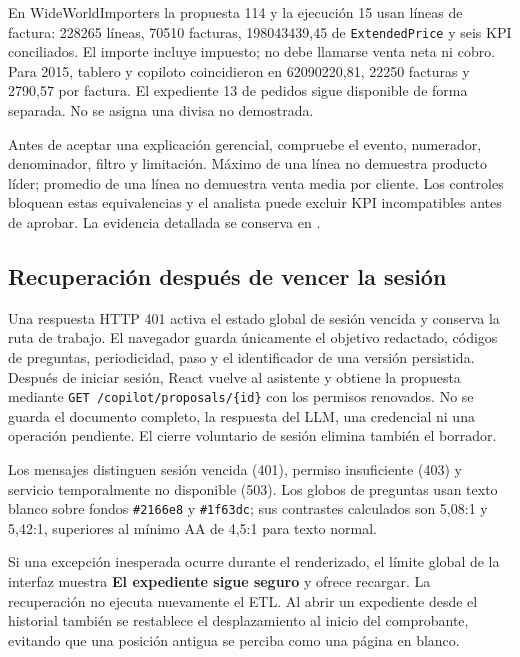 \documentclass[11pt,letterpaper]{article}
\newcommand{\file}[1]{\texttt{#1}}
\begin{document}
En WideWorldImporters la propuesta 114 y la ejecución 15 usan líneas de factura:
228265 líneas, 70510 facturas, 198043439,45 de \file{ExtendedPrice} y seis KPI conciliados.
El importe incluye impuesto; no debe llamarse venta neta ni cobro. Para 2015, tablero y
copiloto coincidieron en 62090220,81, 22250 facturas y 2790,57 por factura. El expediente
13 de pedidos sigue disponible de forma separada. No se asigna una divisa no demostrada.

Antes de aceptar una explicación gerencial, compruebe el evento, numerador, denominador,
filtro y limitación. Máximo de una línea no demuestra producto líder; promedio de una
línea no demuestra venta media por cliente. Los controles bloquean estas equivalencias
y el analista puede excluir KPI incompatibles antes de aprobar. La evidencia detallada
se conserva en .

\subsection{Recuperación después de vencer la sesión}

Una respuesta HTTP 401 activa el estado global de sesión vencida y conserva la ruta de trabajo. El navegador guarda únicamente el objetivo redactado, códigos de preguntas, periodicidad, paso y el identificador de una versión persistida. Después de iniciar sesión, React vuelve al asistente y obtiene la propuesta mediante \file{GET /copilot/proposals/\{id\}} con los permisos renovados. No se guarda el documento completo, la respuesta del LLM, una credencial ni una operación pendiente. El cierre voluntario de sesión elimina también el borrador.

Los mensajes distinguen sesión vencida (401), permiso insuficiente (403) y servicio temporalmente no disponible (503). Los globos de preguntas usan texto blanco sobre fondos \file{\#2166e8} y \file{\#1f63dc}; sus contrastes calculados son 5,08:1 y 5,42:1, superiores al mínimo AA de 4,5:1 para texto normal.

Si una excepción inesperada ocurre durante el renderizado, el límite global de la interfaz muestra \textbf{El expediente sigue seguro} y ofrece recargar. La recuperación no ejecuta nuevamente el ETL. Al abrir un expediente desde el historial también se restablece el desplazamiento al inicio del comprobante, evitando que una posición antigua se perciba como una página en blanco.
\end{document}
